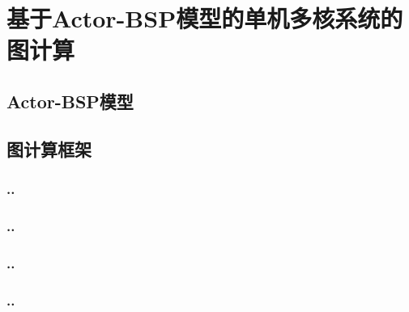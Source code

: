 
\chapter{基于Actor-BSP模型的单机多核系统的图计算}

\section{Actor-BSP模型}

\section{图计算框架}
\subsection{..}
\subsection{..}
\subsection{..}
\subsection{..}






